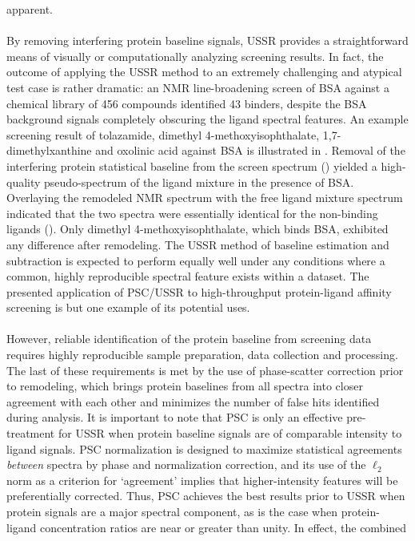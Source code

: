 \begin{doublespace}
apparent.
\\\\
By removing interfering protein baseline signals, USSR provides a
straightforward means of visually or computationally analyzing screening
results. In fact, the outcome of applying the USSR method to an extremely
challenging and atypical test case is rather dramatic: an NMR line-broadening
screen of BSA against a chemical library of 456 compounds identified 43
binders, despite the BSA background signals completely obscuring the ligand
spectral features. An example screening result of tolazamide, dimethyl
4-methoxyisophthalate, 1,7-dimethylxanthine and oxolinic acid against BSA is
illustrated in . Removal of the interfering protein
statistical baseline from the screen spectrum ()
yielded a high-quality pseudo-spectrum of the ligand mixture in the presence
of BSA. Overlaying the remodeled NMR spectrum with the free ligand mixture
spectrum indicated that the two spectra were essentially identical for the
non-binding ligands (). Only
dimethyl 4-methoxyisophthalate, which binds BSA, exhibited
any difference after remodeling. The USSR method of baseline estimation and
subtraction is expected to perform equally well under any conditions where a
common, highly reproducible spectral feature exists within a dataset. The
presented application of PSC/USSR to high-throughput protein-ligand affinity
screening is but one example of its potential uses.
\\\\
However, reliable identification of the protein baseline from screening data
requires highly reproducible sample preparation, data collection and
processing. The last of these requirements is met by the use of phase-scatter
correction prior to remodeling, which brings protein baselines from all spectra
into closer agreement with each other and minimizes the number of false hits
identified during analysis. It is important to note that PSC is only an
effective pre-treatment for USSR when protein baseline signals are of
comparable intensity to ligand signals. PSC normalization is designed to
maximize statistical agreements \emph{between} spectra by phase and
normalization correction, and its use of the $\ell_2$ norm as a criterion for
`agreement' implies that higher-intensity features will be preferentially
corrected. Thus, PSC achieves the best results prior to USSR when protein
signals are a major spectral component, as is the case when protein-ligand
concentration ratios are near or greater than unity. In effect, the combined

\end{doublespace}
